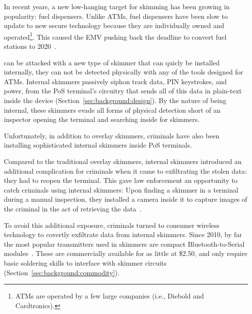 In recent years, a new low-hanging target for skimming has been growing in
popularity: fuel dispensers. Unlike ATMs, fuel dispensers have been slow to
update to new secure technology because they are individually owned and
operated\footnote{ATMs are operated by a few large companies (i.e., Diebold and
Cardtronics).}.
%
This caused the EMV pushing back the deadline to convert fuel stations to 2020~\cite{emv2020}.

can be attacked with a new type of skimmer
that can quicly be installed internally, they can not be detected physically
with any of the tools designed for ATMs.  Internal skimmers passively siphon
track data, PIN keystrokes, and power, from the PoS terminal's circuitry that
sends all of this data in plain-text inside the device
(Section~\ref{sec:background:design}).
%
By the nature of being internal, these skimmers evade all forms of physical
detection short of an inspector opening the terminal and searching inside for
skimmers.





Unfortunately, in addition to overlay skimmers, criminals have also been
installing sophisticated internal skimmers inside PoS terminals.
%

%
%
  
Compared to the traditional overlay skimmers, internal skimmers introduced an
additional complication for criminals when it came to exfiltrating the stolen
data: they had to reopen the terminal.
%
This gave law enforcement an opportunity to catch criminals using internal
skimmers:
%
Upon finding a skimmer in a terminal during a manual inspection, they installed a
camera inside it to capture images of the criminal in the act of
retrieving the data~\cite{camera-in-pump}.

To avoid this additional exposure, criminals turned to consumer wireless
technology to covertly exfiltrate data from internal skimmers. Since 2010, by
far the most popular transmitters used in skimmers are compact Bluetooth-to-Serial
modules~\cite{krebs-siphoning,krebs-pos,krebs-gang,krebs-mexico}.
%
These are commercially available for as little at \$2.50, and only require
basic soldering skills to interface with skimmer circuits
(Section~\ref{sec:background:commodity}).
 
